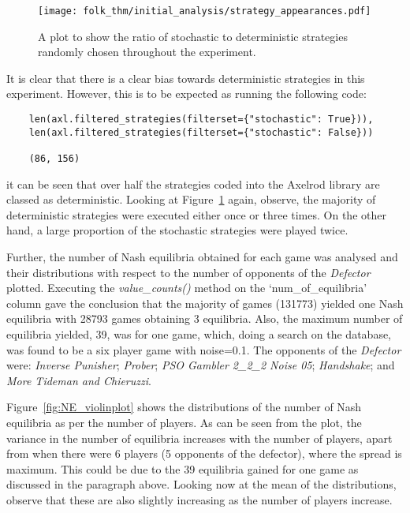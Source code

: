 \begin{figure}
    \centering
    \texttt{[image: folk\_thm/initial\_analysis/strategy\_appearances.pdf]}
    \caption{A plot to show the ratio of stochastic to deterministic strategies randomly chosen throughout the experiment.}\label{fig:stochastic_chart}
\end{figure}

It is clear that there is a clear bias towards deterministic strategies
in this experiment. However, this is to be expected as running the following
code:
\begin{verbatim}
    len(axl.filtered_strategies(filterset={"stochastic": True})), 
    len(axl.filtered_strategies(filterset={"stochastic": False}))

    (86, 156)
\end{verbatim}
it can be seen that over half the strategies coded into the Axelrod library are
classed as deterministic. Looking at Figure~\ref{fig:stochastic_chart} again,
observe, the majority of deterministic strategies were executed either once or
three times. On the other hand, a large proportion of the stochastic strategies
were played twice.

Further, the number of Nash equilibria obtained for each game was analysed and
their distributions with respect to the number of opponents of the
\textit{Defector} plotted. Executing the \textit{value_counts()} method on the
`num_of_equilibria' column gave the conclusion that the majority of games
(131773) yielded one Nash equilibria with 28793 games obtaining 3 equilibria.
Also, the maximum number of equilibria yielded, 39, was for one game, which,
doing a search on the database, was found to be a six player game with
noise=0.1. The opponents of the \textit{Defector} were: \textit{Inverse
Punisher}; \textit{Prober}; \textit{PSO Gambler 2_2_2 Noise 05};
\textit{Handshake}; and \textit{More Tideman and Chieruzzi}.

Figure~\ref{fig:NE_violinplot} shows the distributions of the number of Nash
equilibria as per the number of players. As can be seen from the plot, the
variance in the number of equilibria increases with the number of players, apart
from when there were 6 players (5 opponents of the defector), where the spread
is maximum. This could be due to the 39 equilibria gained for one game as
discussed in the paragraph above. Looking now at the mean of the distributions,
observe that these are also slightly increasing as the number of players
increase. 


